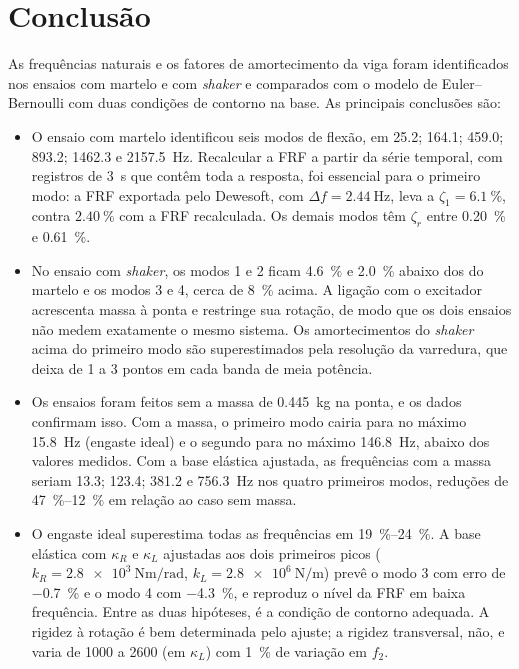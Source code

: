 \section{Conclusão}
\label{sec:conclusao}

As frequências naturais e os fatores de amortecimento da viga foram identificados nos
ensaios com martelo e com \emph{shaker} e comparados com o modelo de Euler--Bernoulli
com duas condições de contorno na base. As principais conclusões são:

\begin{itemize}
    \item O ensaio com martelo identificou seis modos de flexão, em \num{25.2};
          \num{164.1}; \num{459.0}; \num{893.2}; \num{1462.3} e \SI{2157.5}{\hertz}.
          Recalcular a FRF a partir da série temporal, com registros de \SI{3}{\second}
          que contêm toda a resposta, foi essencial para o primeiro modo: a FRF exportada
          pelo Dewesoft, com $\Delta f = \SI{2.44}{\hertz}$, leva a $\zeta_1 =
          \SI{6.1}{\percent}$, contra $\SI{2.40}{\percent}$ com a FRF recalculada. Os
          demais modos têm $\zeta_r$ entre \SI{0.20}{\percent} e \SI{0.61}{\percent}.

    \item No ensaio com \emph{shaker}, os modos 1 e 2 ficam \SI{4.6}{\percent} e
          \SI{2.0}{\percent} abaixo dos do martelo e os modos 3 e 4, cerca de
          \SI{8}{\percent} acima. A ligação com o excitador acrescenta massa à ponta e
          restringe sua rotação, de modo que os dois ensaios não medem exatamente o
          mesmo sistema. Os amortecimentos do \emph{shaker} acima do primeiro modo são
          superestimados pela resolução da varredura, que deixa de 1 a 3 pontos em cada
          banda de meia potência.

    \item Os ensaios foram feitos sem a massa de \SI{0.445}{\kilo\gram} na ponta, e os
          dados confirmam isso. Com a massa, o primeiro modo cairia para no máximo
          \SI{15.8}{\hertz} (engaste ideal) e o segundo para no máximo
          \SI{146.8}{\hertz}, abaixo dos valores medidos. Com a base elástica ajustada, as
          frequências com a massa seriam \num{13.3}; \num{123.4}; \num{381.2} e
          \SI{756.3}{\hertz} nos quatro primeiros modos, reduções de
          \SIrange{47}{12}{\percent} em relação ao caso sem massa.

    \item O engaste ideal superestima todas as frequências em \SIrange{19}{24}{\percent}.
          A base elástica com $\kappa_R$ e $\kappa_L$ ajustadas aos dois primeiros picos
          ($k_R = \SI{2.8e3}{\newton\meter\per\radian}$,
          $k_L = \SI{2.8e6}{\newton\per\meter}$) prevê o modo 3 com erro de
          \SI{-0.7}{\percent} e o modo 4 com \SI{-4.3}{\percent}, e reproduz o nível da
          FRF em baixa frequência. Entre as duas hipóteses, é a condição de contorno
          adequada. A rigidez à rotação é bem determinada pelo ajuste; a rigidez
          transversal, não, e varia de \num{1000} a \num{2600} (em $\kappa_L$) com
          \SI{1}{\percent} de variação em $f_2$.


\end{itemize}
